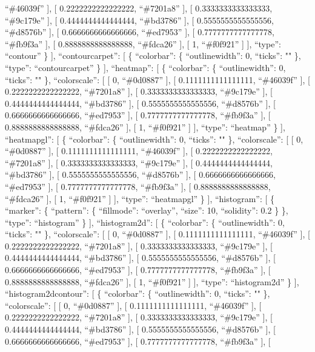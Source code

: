 \documentclass[
]{article}
\begin{document}
``\#46039f'' {]}, {[} 0.2222222222222222, ``\#7201a8'' {]}, {[}
0.3333333333333333, ``\#9c179e'' {]}, {[} 0.4444444444444444,
``\#bd3786'' {]}, {[} 0.5555555555555556, ``\#d8576b'' {]}, {[}
0.6666666666666666, ``\#ed7953'' {]}, {[} 0.7777777777777778,
``\#fb9f3a'' {]}, {[} 0.8888888888888888, ``\#fdca26'' {]}, {[} 1,
``\#f0f921'' {]} {]}, ``type'': ``contour'' \} {]}, ``contourcarpet'':
{[} \{ ``colorbar'': \{ ``outlinewidth'': 0, ``ticks'': "" \}, ``type'':
``contourcarpet'' \} {]}, ``heatmap'': {[} \{ ``colorbar'': \{
``outlinewidth'': 0, ``ticks'': "" \}, ``colorscale'': {[} {[} 0,
``\#0d0887'' {]}, {[} 0.1111111111111111, ``\#46039f'' {]}, {[}
0.2222222222222222, ``\#7201a8'' {]}, {[} 0.3333333333333333,
``\#9c179e'' {]}, {[} 0.4444444444444444, ``\#bd3786'' {]}, {[}
0.5555555555555556, ``\#d8576b'' {]}, {[} 0.6666666666666666,
``\#ed7953'' {]}, {[} 0.7777777777777778, ``\#fb9f3a'' {]}, {[}
0.8888888888888888, ``\#fdca26'' {]}, {[} 1, ``\#f0f921'' {]} {]},
``type'': ``heatmap'' \} {]}, ``heatmapgl'': {[} \{ ``colorbar'': \{
``outlinewidth'': 0, ``ticks'': "" \}, ``colorscale'': {[} {[} 0,
``\#0d0887'' {]}, {[} 0.1111111111111111, ``\#46039f'' {]}, {[}
0.2222222222222222, ``\#7201a8'' {]}, {[} 0.3333333333333333,
``\#9c179e'' {]}, {[} 0.4444444444444444, ``\#bd3786'' {]}, {[}
0.5555555555555556, ``\#d8576b'' {]}, {[} 0.6666666666666666,
``\#ed7953'' {]}, {[} 0.7777777777777778, ``\#fb9f3a'' {]}, {[}
0.8888888888888888, ``\#fdca26'' {]}, {[} 1, ``\#f0f921'' {]} {]},
``type'': ``heatmapgl'' \} {]}, ``histogram'': {[} \{ ``marker'': \{
``pattern'': \{ ``fillmode'': ``overlay'', ``size'': 10, ``solidity'':
0.2 \} \}, ``type'': ``histogram'' \} {]}, ``histogram2d'': {[} \{
``colorbar'': \{ ``outlinewidth'': 0, ``ticks'': "" \}, ``colorscale'':
{[} {[} 0, ``\#0d0887'' {]}, {[} 0.1111111111111111, ``\#46039f'' {]},
{[} 0.2222222222222222, ``\#7201a8'' {]}, {[} 0.3333333333333333,
``\#9c179e'' {]}, {[} 0.4444444444444444, ``\#bd3786'' {]}, {[}
0.5555555555555556, ``\#d8576b'' {]}, {[} 0.6666666666666666,
``\#ed7953'' {]}, {[} 0.7777777777777778, ``\#fb9f3a'' {]}, {[}
0.8888888888888888, ``\#fdca26'' {]}, {[} 1, ``\#f0f921'' {]} {]},
``type'': ``histogram2d'' \} {]}, ``histogram2dcontour'': {[} \{
``colorbar'': \{ ``outlinewidth'': 0, ``ticks'': "" \}, ``colorscale'':
{[} {[} 0, ``\#0d0887'' {]}, {[} 0.1111111111111111, ``\#46039f'' {]},
{[} 0.2222222222222222, ``\#7201a8'' {]}, {[} 0.3333333333333333,
``\#9c179e'' {]}, {[} 0.4444444444444444, ``\#bd3786'' {]}, {[}
0.5555555555555556, ``\#d8576b'' {]}, {[} 0.6666666666666666,
``\#ed7953'' {]}, {[} 0.7777777777777778, ``\#fb9f3a'' {]}, {[}
\end{document}
